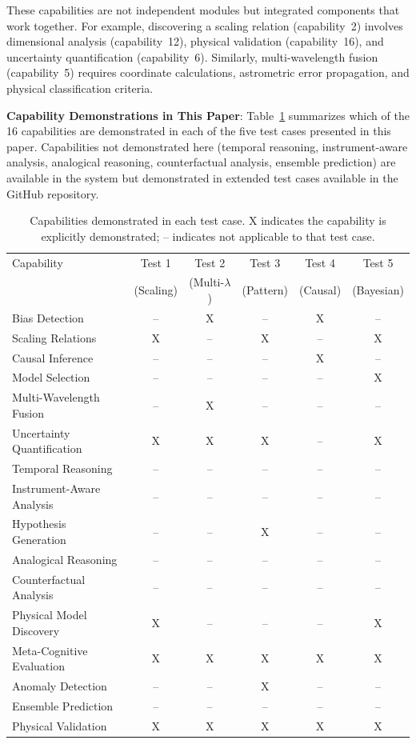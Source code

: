 \documentclass[usenatbib]{rasti}
\begin{document}
These capabilities are not independent modules but integrated components that work together. For example, discovering a scaling relation (capability~2) involves dimensional analysis (capability~12), physical validation (capability~16), and uncertainty quantification (capability~6). Similarly, multi-wavelength fusion (capability~5) requires coordinate calculations, astrometric error propagation, and physical classification criteria.

\textbf{Capability Demonstrations in This Paper}: Table~\ref{tab:capabilities} summarizes which of the 16 capabilities are demonstrated in each of the five test cases presented in this paper. Capabilities not demonstrated here (temporal reasoning, instrument-aware analysis, analogical reasoning, counterfactual analysis, ensemble prediction) are available in the system but demonstrated in extended test cases available in the GitHub repository.

\begin{table}[h]
\centering
\begin{tabular}{lccccc}
\hline
Capability & Test 1 & Test 2 & Test 3 & Test 4 & Test 5 \\
& (Scaling) & (Multi-$\lambda$) & (Pattern) & (Causal) & (Bayesian) \\
\hline
Bias Detection & -- & X & -- & X & -- \\
Scaling Relations & X & -- & X & -- & X \\
Causal Inference & -- & -- & -- & X & -- \\
Model Selection & -- & -- & -- & -- & X \\
Multi-Wavelength Fusion & -- & X & -- & -- & -- \\
Uncertainty Quantification & X & X & X & -- & X \\
Temporal Reasoning & -- & -- & -- & -- & -- \\
Instrument-Aware Analysis & -- & -- & -- & -- & -- \\
Hypothesis Generation & -- & -- & X & -- & -- \\
Analogical Reasoning & -- & -- & -- & -- & -- \\
Counterfactual Analysis & -- & -- & -- & -- & -- \\
Physical Model Discovery & X & -- & -- & -- & X \\
Meta-Cognitive Evaluation & X & X & X & X & X \\
Anomaly Detection & -- & -- & X & -- & -- \\
Ensemble Prediction & -- & -- & -- & -- & -- \\
Physical Validation & X & X & X & X & X \\
\hline
\end{tabular}
\caption{Capabilities demonstrated in each test case. X indicates the capability is explicitly demonstrated; -- indicates not applicable to that test case.}
\label{tab:capabilities}
\end{table}
\end{document}
